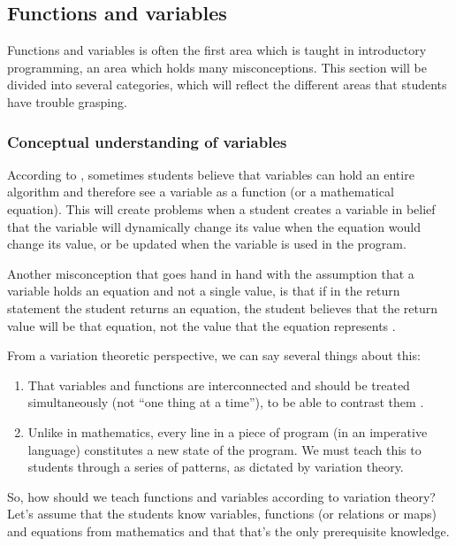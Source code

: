 \subsection{Functions and variables}

Functions and variables is often the first area which is taught in 
introductory programming, an area which holds many misconceptions. This 
section will be divided into several categories, which will reflect the 
different areas that students have trouble grasping.  

\subsubsection{Conceptual understanding of variables}

According to \textcite{
Kohn2017VariableEvaluation,Plass2015Variables,Doukakis2007}, 
sometimes students believe that variables can hold an entire algorithm and 
therefore see a variable as a function (or a mathematical equation).
This will create problems when a student creates a variable in belief that the 
variable will dynamically change its value when the equation would change its 
value, or be updated when the variable is used in the program.

Another misconception that goes hand in hand with the assumption that a 
variable holds an equation and not a single value, is that if in the return 
statement the student returns an equation, the student believes that the return 
value will be that equation, not the value that the equation represents 
\parencite{Kohn2017VariableEvaluation}.

From a variation theoretic perspective, we can say several things about 
this:
\begin{enumerate}
  \item That variables and functions are interconnected and should be treated 
    simultaneously (not \enquote{one thing at a time}), to be able to contrast 
    them \parencite[\cf][Ch~6, pp~167--168]{NCOL}.
  \item Unlike in mathematics, every line in a piece of program (in an 
    imperative language) constitutes a new state of the program.
    We must teach this to students through a series of patterns, as dictated by 
    variation theory.
\end{enumerate}

So, how should we teach functions and variables according to variation theory?
Let's assume that the students know variables, functions (or relations or maps) 
and equations from mathematics and that that's the only prerequisite knowledge.

